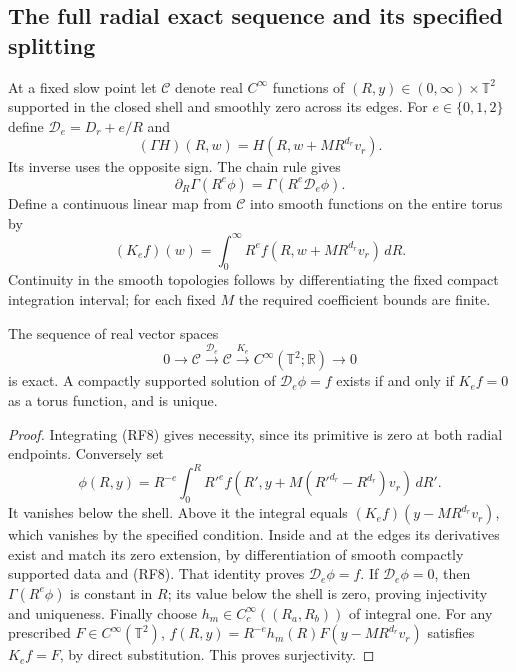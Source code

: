 \documentclass[10pt,a4paper]{article}
\begin{document}
\subsection{The full radial exact sequence and its specified splitting}

At a fixed slow point let \(\mathcal C\) denote real
\(C^\infty\) functions of \((R,y)\in(0,\infty)\times\mathbb T^2\)
supported in the closed shell and smoothly zero across its edges. For
\(e\in\{0,1,2\}\) define \(\mathcal D_e=D_r+e/R\) and
\[
(\Gamma H)(R,w)=H(R,w+MR^{d_r}v_r).
\]
Its inverse uses the opposite sign. The chain rule gives
\[
\partial_R\Gamma(R^e\phi)=\Gamma(R^e\mathcal D_e\phi).
\tag{RF8}
\]
Define a continuous linear map from \(\mathcal C\) into smooth
functions on the entire torus by
\[
(K_ef)(w)=\int_0^\infty R^e f(R,w+MR^{d_r}v_r)\,dR.
\tag{RF9}
\]
Continuity in the smooth topologies follows by differentiating the fixed
compact integration interval; for each fixed \(M\) the required
coefficient bounds are finite.

\begin{siproposition}
The sequence of real vector spaces
\[
0\longrightarrow\mathcal C\xrightarrow{\mathcal D_e}\mathcal C
\xrightarrow{K_e}C^\infty(\mathbb T^2;\mathbb R)
\longrightarrow0
\tag{RF10}
\]
is exact. A compactly supported solution of \(\mathcal D_e\phi=f\)
exists if and only if \(K_ef=0\) as a torus function, and is unique.
\end{siproposition}
\begin{proof}
Integrating (RF8) gives necessity, since its primitive is zero at both
radial endpoints. Conversely set
\[
\phi(R,y)=R^{-e}\int_0^R R'^e
f(R',y+M(R'^{d_r}-R^{d_r})v_r)\,dR'.
\tag{RF11}
\]
It vanishes below the shell. Above it the integral equals
\((K_ef)(y-MR^{d_r}v_r)\), which vanishes by the specified condition.
Inside and at the edges its derivatives exist and match its zero
extension, by differentiation of smooth compactly supported data and
(RF8). That identity proves \(\mathcal D_e\phi=f\). If
\(\mathcal D_e\phi=0\), then \(\Gamma(R^e\phi)\) is constant
in \(R\); its value below the shell is zero, proving injectivity and
uniqueness. Finally choose \(h_m\in C_c^\infty((R_a,R_b))\) of
integral one. For any prescribed \(F\in C^\infty(\mathbb T^2)\),
\(f(R,y)=R^{-e}h_m(R)F(y-MR^{d_r}v_r)\) satisfies
\(K_ef=F\), by direct substitution. This proves surjectivity.
\end{proof}
\end{document}
